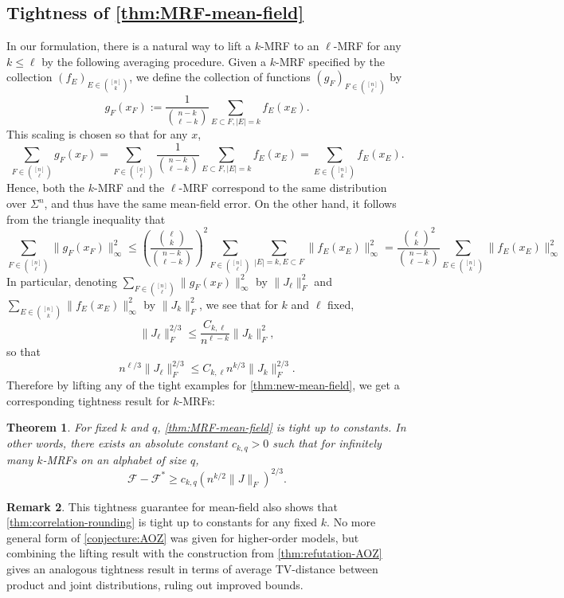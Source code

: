 \documentclass[11pt, oneside, english]{article}
\newcommand{\F}{\mathcal{F}}
\newtheorem{theorem}{Theorem}[section]
\theoremstyle{definition}
\newtheorem{remark}[theorem]{Remark}
\theoremstyle{plain}
\begin{document}
\subsection{Tightness of \cref{thm:MRF-mean-field}}
In our formulation, there is a natural way to lift a $k$-MRF to an $\ell$-MRF for any $k \le \ell$ by the following averaging procedure. Given a $k$-MRF specified by the collection $(f_E)_{E \in \binom{[n]}{k}}$, we define the collection of functions $(g_F)_{F \in \binom{[n]}{\ell}}$ by
\[ g_F(x_F) := \frac{1}{{n - k \choose \ell - k}} \sum_{E \subset F, |E| = k} f_E(x_E). \]
This scaling is chosen so that for any $x$,
\[ \sum_{F \in \binom{[n]}{\ell}} g_F(x_F) = \sum_{F \in \binom{[n]}{\ell}}\frac{1}{{n - k \choose \ell - k}} \sum_{E \subset F, |E| = k} f_E(x_E) = \sum_{E \in \binom{[n]}{k}} f_E(x_E).\]
Hence, both the $k$-MRF and the $\ell$-MRF correspond to the same distribution over $\Sigma^{n}$, and thus have the same mean-field error. On the other hand, it follows from the triangle inequality that 
\[ \sum_{F \in \binom{[n]}{\ell}} \|g_F(x_F)\|_{\infty}^2 \le \left(\frac{{\ell \choose k}}{{n - k \choose \ell - k}}\right)^2 \sum_{F \in \binom{[n]}{\ell}} \sum_{|E| = k, E \subset F} \|f_E(x_E)\|_{\infty}^2 = \frac{{\ell \choose k}^2}{{n - k \choose \ell - k}} \sum_{E \in \binom{[n]}{k}} \|f_E(x_E)\|_{\infty}^2 \]
In particular, denoting $\sum_{F \in \binom{[n]}{\ell}} \|g_F(x_F)\|_{\infty}^2$ by $\|J_\ell\|_{F}^{2}$ and $\sum_{E \in \binom{[n]}{k}} \|f_E(x_E)\|_{\infty}^2$ by $\|J_k\|_{F}^{2}$, we see that for $k$ and $\ell$ fixed,
$$\|J_\ell\|_{F}^{2/3} \leq \frac{C_{k,\ell}}{n^{\ell - k}}\|J_k\|_{F}^{2},$$
so that
$$n^{\ell/3}\|J_\ell\|_{F}^{2/3} \leq C_{k,\ell}n^{k/3}\|J_k\|_{F}^{2/3}.$$
Therefore by lifting any of the tight examples for \cref{thm:new-mean-field}, we get a corresponding tightness result for $k$-MRFs:
\begin{theorem}
For fixed $k$ and $q$, \cref{thm:MRF-mean-field} is tight up to constants. In other words, there exists an absolute constant $c_{k,q} > 0$ such that for infinitely many $k$-MRFs on an alphabet of size $q$, 
\[ \F - \F^* \ge c_{k,q} \left(n^{k/2} \|J\|_F\right)^{2/3}.\]
\end{theorem}
\begin{remark}
This tightness guarantee for mean-field also shows that \cref{thm:correlation-rounding} is tight up to constants for any fixed $k$. No more general form of \cref{conjecture:AOZ} was given for higher-order models, but combining the lifting result with the construction from \cref{thm:refutation-AOZ} gives an analogous tightness result in terms of average TV-distance between product and joint distributions, ruling out improved bounds.
\end{remark}
\end{document}
